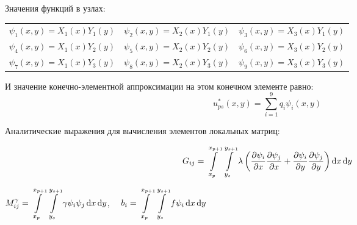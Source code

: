 \begin{center}
\end{center}

Значения функций в узлах:

\begin{center}
\begin{tabular}{ccc}
$\displaystyle \psi_1(x, y) = X_1(x) Y_1(y) $ &
$\displaystyle \psi_2(x, y) = X_2(x) Y_1(y) $ &
$\displaystyle \psi_3(x, y) = X_3(x) Y_1(y) $ \\

$\displaystyle \psi_4(x, y) = X_1(x) Y_2(y) $ &
$\displaystyle \psi_5(x, y) = X_2(x) Y_2(y) $ &
$\displaystyle \psi_6(x, y) = X_3(x) Y_2(y) $ \\

$\displaystyle \psi_7(x, y) = X_1(x) Y_3(y) $ &
$\displaystyle \psi_8(x, y) = X_2(x) Y_3(y) $ &
$\displaystyle \psi_9(x, y) = X_3(x) Y_3(y) $
\end{tabular}
\end{center}

И значение конечно-элементной аппроксимации на этом конечном элементе равно:
$$ u^{*}_{ps}(x, y) = \sum_{i=1}^9 q_i \psi_i(x, y)  $$

Аналитические выражения для вычисления элементов локальных матриц:

$$ G_{ij} = \int\limits_{x_p}^{x_{p+1}}\int\limits_{y_s}^{y_{s+1}} \lambda\left(\frac{\partial \psi_i}{\partial x}\frac{\partial \psi_j}{\partial x} + \frac{\partial \psi_i}{\partial y}\frac{\partial \psi_j}{\partial y}\right) \operatorname{d}\!x \operatorname{d}\!y $$

\begin{center}
$\displaystyle M_{ij}^\gamma = \int\limits_{x_p}^{x_{p+1}}\int\limits_{y_s}^{y_{s+1}} \gamma \psi_i \psi_j \operatorname{d}\!x \operatorname{d}\!y $, $\displaystyle \quad b_i = \int\limits_{x_p}^{x_{p+1}}\int\limits_{y_s}^{y_{s+1}} f \psi_i \operatorname{d}\!x \operatorname{d}\!y $
\end{center}

